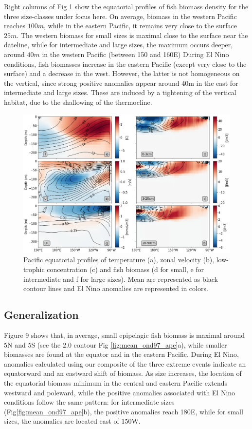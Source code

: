 Right columns of Fig \ref{fig:profiles} show the equatorial profiles of fish biomass density for the three size-classes under focus here. On average, biomass in the western Pacific reaches $100m$, while in the eastern Pacific, it remains very close to the surface $25m$. The western biomass for small sizes is maximal close to the surface near the dateline, while for intermediate and large sizes, the maximum occurs deeper, around $40m$ in the western Pacific (between 150 and 160\degree{}E)
During El Nino conditions, fish biomasses increase in the eastern Pacific (except very close to the surface) and a decrease in the west. However, the latter is not homogeneous on the vertical, since strong positive anomalies appear around 40m in the east for intermediate and large sizes. These are induced by a tightening of the vertical habitat, due to the shallowing of the thermocline.

\begin{figure}[h!tp]
	\centering
	\includegraphics[scale=0.4]{figs/forage_mean_ond97.png}	
	\caption{Pacific equatorial profiles of temperature (a), zonal velocity (b), low-trophic concentration (c) and fish biomass (d for small, e for intermediate and f for large sizes). Mean are represented as black contour lines and El Nino anomalies are represented in colors.}	
	\label{fig:profiles}
\end{figure}

\subsection{Generalization}


Figure 9 shows that, in average, small epipelagic fish biomass is maximal around 5\degree{}N and 5\degree{}S (see the $2.0$ contour Fig \ref{fig:mean_ond97_ape}a), while smaller biomasses are found at the equator and in the eastern Pacific. During El Nino, anomalies calculated using our composite of the three extreme events indicate an equatorward and an eastward shift of biomass.
As size increases, the location of the equatorial biomass minimum in the central and eastern Pacific extends westward and poleward, while the positive anomalies associated with El Nino conditions follow the same pattern: for intermediate sizes (Fig\ref{fig:mean_ond97_ape}b), the positive anomalies reach 180\degree{}E, while for small sizes, the anomalies are located east of 150\degree{}W. 

